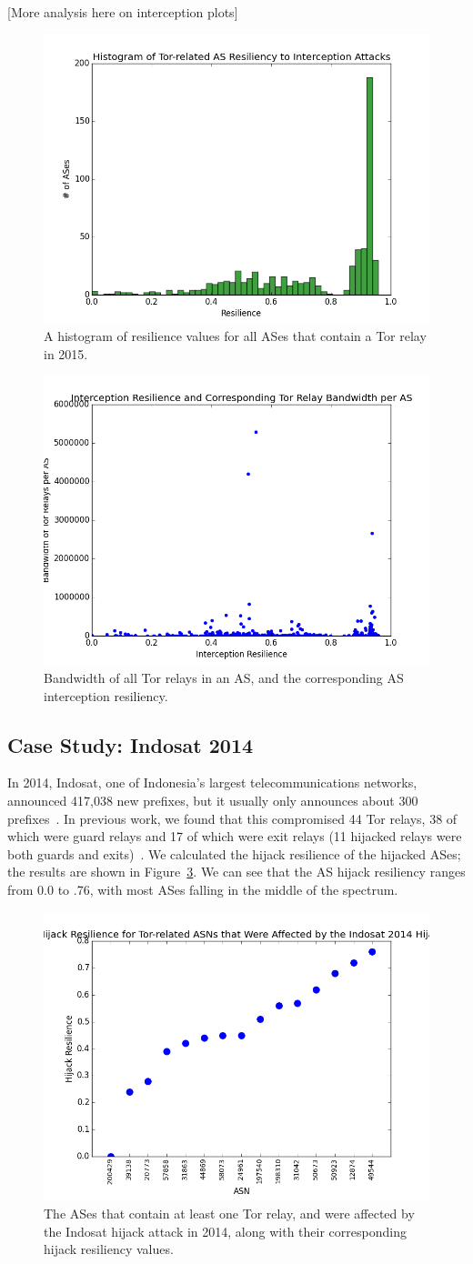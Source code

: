 [More analysis here on interception plots]

\begin{figure}
\centering
\includegraphics[width=.5\textwidth]{interception_resiliency}
\caption{A histogram of resilience values for all ASes that contain a Tor relay in 2015.}
\label{fig:interception_histogram}
\end{figure}

\begin{figure}
\centering
\includegraphics[width=.5\textwidth]{interception_bandwidth}
\caption{Bandwidth of all Tor relays in an AS, and the corresponding AS interception resiliency.}
\label{fig:interception_bw}
\end{figure}

\subsection{Case Study: Indosat 2014}
In 2014, Indosat, one of Indonesia's largest telecommunications networks, announced 417,038 new prefixes, but it usually only announces about 300 prefixes~\cite{indosat2014}.  In previous work, we found that this compromised 44 Tor relays, 38 of which were guard relays and 17 of which were exit relays (11 hijacked relays were both guards and exits)~\cite{sun2015raptor}.  We calculated the hijack resilience of the hijacked ASes; the results are shown in Figure~\ref{fig:case_study}.  We can see that the AS hijack resiliency ranges from 0.0 to .76, with most ASes falling in the middle of the spectrum. 

\begin{figure}
\centering
\includegraphics[width=.5\textwidth]{case_study_graph}
\caption{The ASes that contain at least one Tor relay, and were affected by the Indosat hijack attack in 2014, along with their corresponding hijack resiliency values.}
\label{fig:case_study}
\end{figure}
